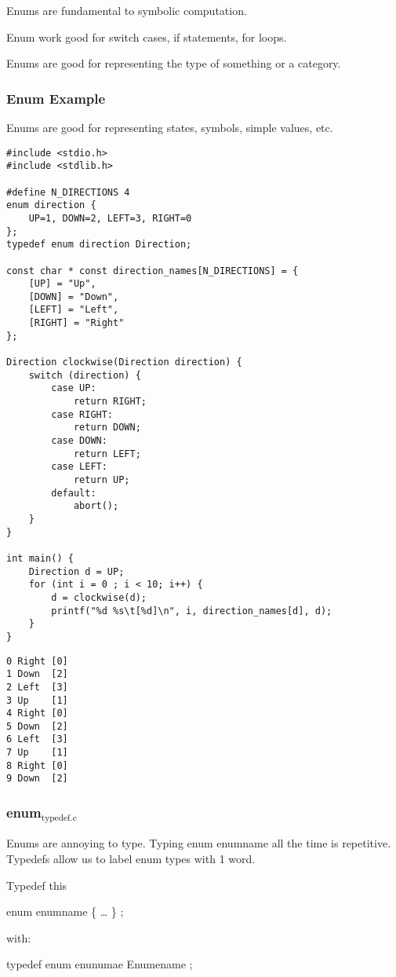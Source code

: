 \documentclass[11pt]{article}
\begin{document}
Enums are fundamental to symbolic computation.

Enum work good for switch cases, if statements, for loops.

Enums are good for representing the type of something or a category.

\subsubsection{Enum Example}
\label{sec:orgb252f6a}

Enums are good for representing states, symbols, simple values, etc.

\begin{verbatim}
#include <stdio.h>
#include <stdlib.h>

#define N_DIRECTIONS 4
enum direction {
    UP=1, DOWN=2, LEFT=3, RIGHT=0
};
typedef enum direction Direction;

const char * const direction_names[N_DIRECTIONS] = {
    [UP] = "Up",
    [DOWN] = "Down",
    [LEFT] = "Left",
    [RIGHT] = "Right"
};

Direction clockwise(Direction direction) {
    switch (direction) {
        case UP:
            return RIGHT;
        case RIGHT:
            return DOWN;
        case DOWN:
            return LEFT;
        case LEFT:
            return UP;
        default:
            abort();
    }
}

int main() {
    Direction d = UP;
    for (int i = 0 ; i < 10; i++) {
        d = clockwise(d);
        printf("%d %s\t[%d]\n", i, direction_names[d], d);
    }
}
\end{verbatim}

\begin{verbatim}
0 Right	[0]
1 Down	[2]
2 Left	[3]
3 Up	[1]
4 Right	[0]
5 Down	[2]
6 Left	[3]
7 Up	[1]
8 Right	[0]
9 Down	[2]
\end{verbatim}

\subsubsection{enum\(_{\text{typedef.c}}\)}
\label{sec:org49061be}

Enums are annoying to type. Typing enum enumname all the time is
repetitive. Typedefs allow us to label enum types with 1 word.

Typedef this 

enum enumname \{ \ldots{} \} ;

with:

typedef enum enunumae Enumename ;
\end{document}
